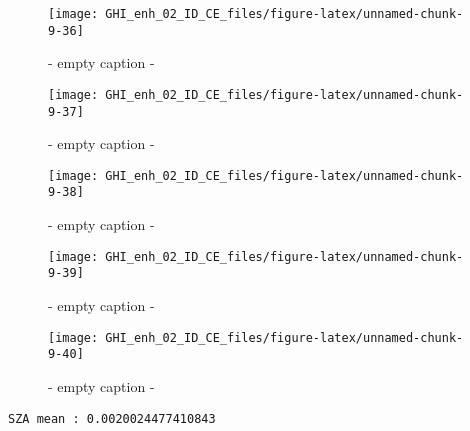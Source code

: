 \documentclass[
  10pt,
  a4paper,oneside]{article}
\begin{document}
\begin{figure}[H]

{\centering \texttt{[image: GHI\_enh\_02\_ID\_CE\_files/figure-latex/unnamed-chunk-9-36]} 

}

\caption{ - empty caption - }\label{fig:unnamed-chunk-9-36}
\end{figure}
\begin{figure}[H]

{\centering \texttt{[image: GHI\_enh\_02\_ID\_CE\_files/figure-latex/unnamed-chunk-9-37]} 

}

\caption{ - empty caption - }\label{fig:unnamed-chunk-9-37}
\end{figure}
\begin{figure}[H]

{\centering \texttt{[image: GHI\_enh\_02\_ID\_CE\_files/figure-latex/unnamed-chunk-9-38]} 

}

\caption{ - empty caption - }\label{fig:unnamed-chunk-9-38}
\end{figure}
\begin{figure}[H]

{\centering \texttt{[image: GHI\_enh\_02\_ID\_CE\_files/figure-latex/unnamed-chunk-9-39]} 

}

\caption{ - empty caption - }\label{fig:unnamed-chunk-9-39}
\end{figure}
\begin{figure}[H]

{\centering \texttt{[image: GHI\_enh\_02\_ID\_CE\_files/figure-latex/unnamed-chunk-9-40]} 

}

\caption{ - empty caption - }\label{fig:unnamed-chunk-9-40}
\end{figure}

\begin{verbatim}
SZA mean : 0.0020024477410843 
\end{verbatim}
\end{document}
